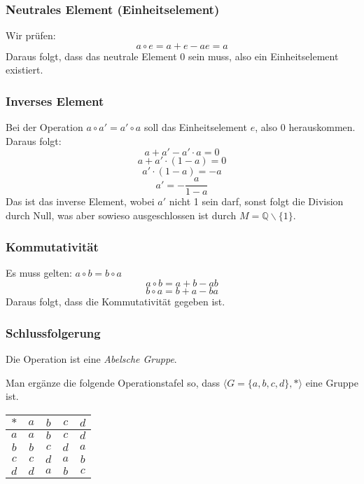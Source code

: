 \documentclass[a4paper, 12pt, margins=3cm]{homework}
\newcommand{\Q}{\mathbb{Q}}
\begin{document}
\begin{solution}
    \subsubsection*{Neutrales Element (Einheitselement)}
      Wir prüfen:
        \[ a\circ e = a+e-ae = a \]
      Daraus folgt, dass das neutrale Element 0 sein muss, also ein Einheitselement
      existiert.

    \subsubsection*{Inverses Element}
      Bei der Operation $a\circ a' = a'\circ a$ soll das Einheitselement $e$, also
      0 herauskommen.
      Daraus folgt:
        \[ a+a'-a'\cdot a = 0 \]
        \[ a+a'\cdot (1-a) = 0 \]
        \[ a'\cdot (1-a) = -a \]
        \[ a' = - \frac{a}{1-a} \]
      Das ist das inverse Element, wobei $a'$ nicht 1 sein darf, sonst folgt die
      Division durch Null, was aber sowieso ausgeschlossen ist durch $M = \Q\backslash \{1\}$.

    \subsubsection*{Kommutativität}
      Es muss gelten: $a\circ b = b\circ a$
        \[ a\circ b = a+b-ab \]
        \[ b\circ a = b+a-ba \]
      Daraus folgt, dass die Kommutativität gegeben ist.

    \subsubsection*{Schlussfolgerung}
      Die Operation ist eine \emph{Abelsche Gruppe}.
  \end{solution}



  \begin{problem}
    Man ergänze die folgende Operationstafel so, dass $\langle G=\{a,b,c,d\},*\rangle$
    eine Gruppe ist.

    \begin{center}
      \begin{tabular}{c|cccc}
         $*$ & $a$ & $b$ & $c$ & $d$ \\ \hline
         $a$ & $a$ & $b$ & $c$ & $d$ \\
         $b$ & $b$ & $c$ & $d$ & $a$ \\
         $c$ & $c$ & $d$ & $a$ & $b$ \\
         $d$ & $d$ & $a$ & $b$ & $c$
      \end{tabular}
    \end{center}
  \end{problem}
  \begin{solution}
    
  \end{solution}
\end{document}
